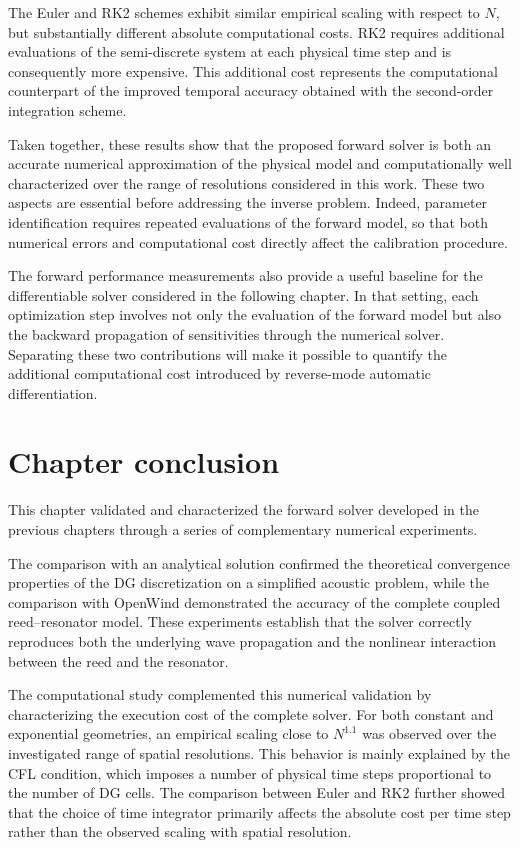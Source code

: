 \documentclass[11pt,a4paper]{report}
\theoremstyle{plain}
\theoremstyle{definition}
\begin{document}
The Euler and RK2 schemes exhibit similar empirical scaling with respect to
$N$, but substantially different absolute computational costs. RK2 requires
additional evaluations of the semi-discrete system at each physical time step
and is consequently more expensive. This additional cost represents the
computational counterpart of the improved temporal accuracy obtained with the
second-order integration scheme.

Taken together, these results show that the proposed forward solver is both an
accurate numerical approximation of the physical model and computationally
well characterized over the range of resolutions considered in this work.
These two aspects are essential before addressing the inverse problem.
Indeed, parameter identification requires repeated evaluations of the forward
model, so that both numerical errors and computational cost directly affect
the calibration procedure.

The forward performance measurements also provide a useful baseline for the
differentiable solver considered in the following chapter. In that setting,
each optimization step involves not only the evaluation of the forward model
but also the backward propagation of sensitivities through the numerical
solver. Separating these two contributions will make it possible to quantify
the additional computational cost introduced by reverse-mode automatic
differentiation.


\section*{Chapter conclusion}

This chapter validated and characterized the forward solver developed in the
previous chapters through a series of complementary numerical experiments.

The comparison with an analytical solution confirmed the theoretical
convergence properties of the DG discretization on a simplified acoustic
problem, while the comparison with OpenWind demonstrated the accuracy of the
complete coupled reed--resonator model. These experiments establish that the
solver correctly reproduces both the underlying wave propagation and the
nonlinear interaction between the reed and the resonator.

The computational study complemented this numerical validation by
characterizing the execution cost of the complete solver. For both constant
and exponential geometries, an empirical scaling close to $N^{1.1}$ was
observed over the investigated range of spatial resolutions. This behavior is
mainly explained by the CFL condition, which imposes a number of physical time
steps proportional to the number of DG cells. The comparison between Euler
and RK2 further showed that the choice of time integrator primarily affects
the absolute cost per time step rather than the observed scaling with spatial
resolution.
\end{document}

